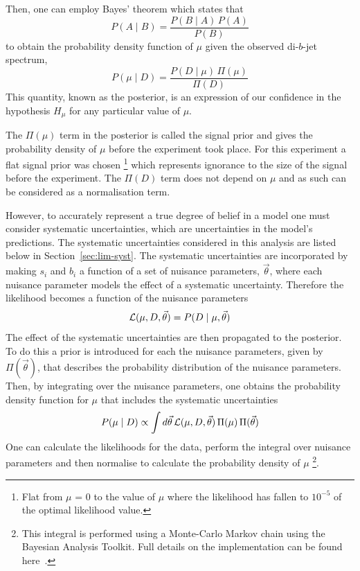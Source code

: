 \noindent
Then, one can employ Bayes' theorem which states that
\begin{equation}
  P(A \mid B) = \frac{P(B \mid A) \, P(A)}{P(B)}
\end{equation}
to obtain the probability density function of $\mu$ given the observed di-$b$-jet spectrum,
\begin{equation}
  P(\mu \mid D) = \frac{ P(D \mid \mu) \, \Pi( \mu ) }{ \Pi( D ) }
  \label{eq:lim-conf_statOnly}
\end{equation}
This quantity, known as the posterior, is an expression of our confidence in the hypothesis
$H_\mu$ for any particular value of $\mu$.

The $\Pi( \mu )$ term in the posterior %
is called the signal prior
and gives the probability density of $\mu$ before the experiment took place.
For this experiment a flat signal prior was chosen
\footnote{Flat from $\mu$ = 0 to the value of $\mu$ where the
likelihood has fallen to $10^{-5}$ of the optimal likelihood value.}
which represents ignorance to the size of the signal before the experiment.
The $\Pi(D)$ term does not depend on $\mu$ and as such can be considered as a normalisation term.

However, to accurately represent a true degree of belief in a model one must consider systematic uncertainties,
which are uncertainties in the model's predictions.
The systematic uncertainties considered in this analysis are listed below in Section~\ref{sec:lim-syst}.
The systematic uncertainties are incorporated by making $s_i$ and $b_i$ a function of a set of
nuisance parameters, $\vec{\theta}$, where each nuisance parameter models the effect of a systematic uncertainty.
Therefore the likelihood becomes a function of the nuisance parameters
\begin{equation}
  \mathcal{L} (\mu,D,\vec{\theta}) = P(D \mid \mu, \vec{\theta} ) 
\end{equation}
The effect of the systematic uncertainties are then propagated to the posterior. %
To do this a prior is introduced for each the nuisance parameters, given by $\Pi(\vec{\theta})$,
that describes the probability distribution of the nuisance parameters.
Then, by integrating over the nuisance parameters,
one obtains the probability density function for $\mu$ that includes the systematic uncertainties
\begin{equation}
  P(\mu \mid D) \propto \int d \vec{\theta} \, \mathcal{L} (\mu, D, \vec{\theta} ) \, \Pi( \mu )  \, \Pi(\vec{\theta})
  \label{eq:lim-conf_syst}
\end{equation}
One can calculate the likelihoods for the data,
perform the integral over nuisance parameters
and then normalise to calculate the probability density of $\mu$
\footnote{This integral is performed using a Monte-Carlo Markov chain using the Bayesian Analysis Toolkit.
 Full details on the implementation can be found here~\cite{det-thesis_kate}.}.

